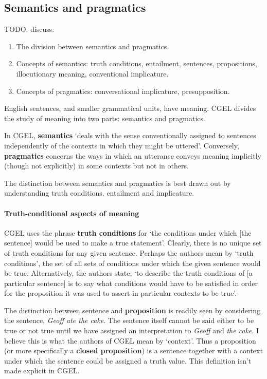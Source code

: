 \documentclass{scrarticle}
\begin{document}
\subsection{Semantics and pragmatics}

\large{TODO:} discuss:
\begin{enumerate}
    \item The division between semantics and pragmatics.
    \item Concepts of semantics: truth conditions, entailment, sentences, propositions,
	illocutionary meaning, conventional implicature.
    \item Concepts of pragmatics: conversational implicature, presupposition.
\end{enumerate}

English sentences, and smaller grammatical units, have meaning. CGEL divides the study of meaning
into two parts: semantics and pragmatics.

In CGEL, \textbf{semantics} `deals with the sense conventionally assigned to sentences independently
of the contexts in which they might be uttered'. Conversely, \textbf{pragmatics} concerns the ways
in which an utterance conveys meaning implicitly (though not explicitly) in some contexts but not in
others.

The distinction between semantics and pragmatics is best drawn out by understanding truth
conditions, entailment and implicature.

\paragraph{Truth-conditional aspects of meaning}

CGEL uses the phrase \textbf{truth conditions} for `the conditions under which [the sentence] would
be used to make a true statement'. Clearly, there is no unique set of truth conditions for any given
sentence. Perhaps the authors mean by `truth conditions', the set of all sets of conditions under
which the given sentence would be true. Alternatively, the authors state, `to describe the truth
conditions of [a particular sentence] is to say what conditions would have to be satisfied in order
for the proposition it was used to assert in particular contexts to be true'.

The distinction between sentence and \textbf{proposition} is readily seen by considering the
sentence, \emph{Geoff ate the cake}. The sentence itself cannot be said either to be true or not
true until we have assigned an interpretation to \emph{Geoff} and \emph{the cake}. I believe this is
what the authors of CGEL mean by `context'. Thus a proposition (or more specifically a
\textbf{closed proposition}) is a sentence together with a context under which the sentence could be
assigned a truth value. This definition isn't made explicit in CGEL.
\end{document}
